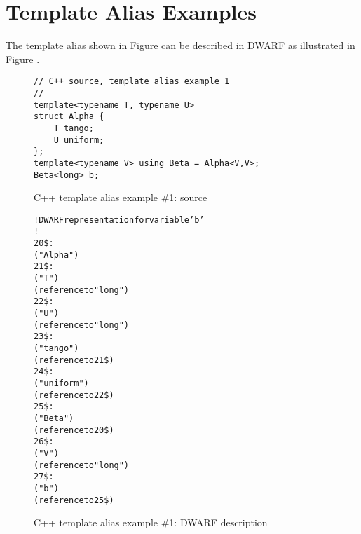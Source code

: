 \section{Template Alias Examples}
\label{app:templatealiasexample}

The  template alias shown in
Figure 
can be described in DWARF as illustrated 
 in 
Figure .

\begin{figure}[h]
\begin{lstlisting}
// C++ source, template alias example 1
//
template<typename T, typename U>
struct Alpha {
    T tango;
    U uniform;
};
template<typename V> using Beta = Alpha<V,V>;
Beta<long> b;
\end{lstlisting}
\caption{C++ template alias example \#1: source}
\label{fig:ctemplatealiasexample1source}
\end{figure}

\begin{figure}[h]
\begin{dwflisting}
\begin{alltt}
! DWARF representation for variable 'b'
!
20\$: 
        ("Alpha")
21\$:   
            ("T")
            (reference to "long")
22\$:   
            ("U")
            (reference to "long")
23\$:   
            ("tango")
            (reference to 21\$)
24\$:   
            ("uniform")
            (reference to 22\$)
25\$: 
        ("Beta")
        (reference to 20\$)
26\$:   
            ("V")
            (reference to "long")
27\$: 
        ("b")
        (reference to 25\$)
\end{alltt}
\end{dwflisting}
\caption{C++ template alias example \#1: DWARF description}
\label{fig:ctemplatealiasexample1dwarf}
\end{figure}

